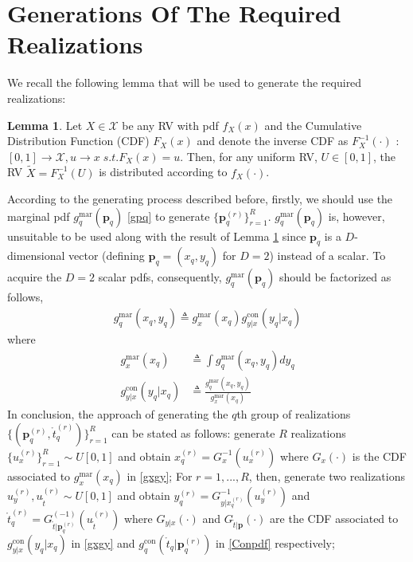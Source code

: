 \documentclass[review]{elsarticle}
\begin{document}
\section{Generations Of The Required Realizations}
We recall the following lemma \cite{Kay2006Intuitive} that will be used to generate the required realizations:
\theoremstyle{definition} \newtheorem{Lemma}{Lemma}
\begin{Lemma}\label{Lemma1}
    Let $X \in \mathcal{X}$ be any RV with pdf $f_X(x)$ and the Cumulative Distribution Function (CDF) $F_X(x)$ and denote the inverse CDF as $F_X^{-1}(\cdot)$ : $[0,1]\to \mathcal{X},  u\to x \; s.t. F_X(x)=u$. Then, for any uniform RV, $U\in [0,1]$, the RV $\tilde{X}=F_X^{-1}(U)$ is distributed according to $f_X(\cdot)$.
\end{Lemma}
According to the generating process described before, firstly, we should use the marginal pdf $g_{q}^{\text{mar}}(\boldsymbol{p}_q)$ \eqref{gpq} to generate $\lbrace \boldsymbol{p}_q^{(r)}\rbrace_{r=1}^R$. $g_{q}^{\text{mar}}(\boldsymbol{p}_q)$ is, however, unsuitable to be used along with the result of Lemma \ref{Lemma1} since $\boldsymbol{p}_q$ is a $D$-dimensional vector (defining $\boldsymbol{p}_q=(x_q,y_q)$ for $D=2$) instead of a scalar. To acquire the $D=2$ scalar pdfs, consequently, $g_{q}^{\text{mar}}(\boldsymbol{p}_q)$ should be factorized as follows,
\begin{align}
    g_{q}^{\text{mar}}(x_q,y_q)\triangleq g_{x}^{\text{mar}}(x_q)g_{y\vert x}^{\text{con}}(y_q\vert x_q)
\end{align}
where 
\begin{align}\label{gxgy}
    g_{x}^{\text{mar}}(x_q)&\triangleq \int g_{q}^{\text{mar}}(x_q,y_q) dy_q\\
    g_{y\vert x}^{\text{con}}(y_q\vert x_q)&\triangleq \frac{g_{q}^{\text{mar}}(x_q,y_q)}{g_{x}^{\text{mar}}(x_q)}
\end{align}
In conclusion, the approach of generating the $q$th group of realizations $\lbrace(\boldsymbol{p}_q^{(r)},\mathring{t}_q^{(r)})\rbrace_{r=1}^{R}$ can be stated as follows: generate $R$ realizations $\lbrace u_x^{(r)}\rbrace_{r=1}^R\sim U[0,1]$ and obtain $x_q^{(r)}=G_x^{-1}(u_x^{(r)})$ where $G_x(\cdot)$ is the CDF associated to $g_{x}^{\text{mar}}(x_q)$ in \eqref{gxgy}; For $r=1,...,R$, then, generate two realizations $u_y^{(r)},u_{\mathring{t}}^{(r)}\sim U[0,1]$ and obtain $y_q^{(r)}=G_{y\vert x_q^{(r)}}^{-1}(u_y^{(r)})$ and $\mathring{t}_q^{(r)}=G^{(-1)}_{\mathring{t}\vert \boldsymbol{p}_q^{(r)}}(u_{\mathring{t}}^{(r)})$ where $G_{y\vert x}(\cdot)$ and $G_{\mathring{t}\vert \boldsymbol{p}}(\cdot)$ are the CDF associated to $g_{y\vert x}^{\text{con}}(y_q\vert x_q)$ in \eqref{gxgy} and $g_{q}^{\text{con}}(\mathring{t}_q\vert \boldsymbol{p}_q^{(r)})$ in \eqref{Conpdf} respectively; 
\end{document}
